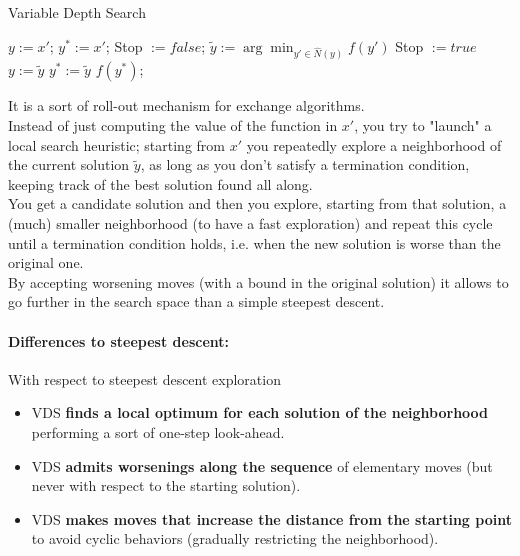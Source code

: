 \documentclass[11pt]{article}
\begin{document}
	\begin{algorithm}
		\caption{Variable Depth Search}
		\begin{algorithmic}
			\STATE $y := x'$; $y^\ast := x'$; Stop $:= false$;
				\STATE $\tilde{y} := \arg \min_{y' \in \hat{N}(y)} f(y')$
					\STATE Stop $:= true$
				\ELSE
					\STATE $y := \tilde{y}$
				\ENDIF
					\STATE $y^\ast := \tilde{y}$
				\ENDIF
			\ENDWHILE
			\RETURN $f (y^\ast)$;
		\end{algorithmic}
	\end{algorithm}
	It is a sort of roll-out mechanism for exchange algorithms.\\
	
	Instead of just computing the value of the function in $x'$, you try to "launch" a local search heuristic; starting from $x'$ you repeatedly explore a neighborhood of the current solution $\tilde{y}$, as long as you don't satisfy a termination condition, keeping track of the best solution found all along.\\
	
	You get a candidate solution and then you explore, starting from that solution, a (much) smaller neighborhood (to have a fast exploration) and repeat this cycle until a termination condition holds, i.e. when the new solution is worse than the original one.\\
	
	By accepting worsening moves (with a bound in the original solution) it allows to go further in the search space than a simple steepest descent.\\
	
	\newpage
	
	\paragraph{Differences to steepest descent:} With respect to steepest descent exploration
	\begin{itemize}
		\item VDS \textbf{finds a local optimum for each solution of the neighborhood} performing a sort of one-step look-ahead.\\
		
		\item VDS \textbf{admits worsenings along the sequence} of elementary moves (but never with respect to the starting solution).\\
		
		\item VDS \textbf{makes moves that increase the distance from the starting point} to avoid cyclic behaviors (gradually restricting the neighborhood).\\
	\end{itemize}
	
\end{document}

